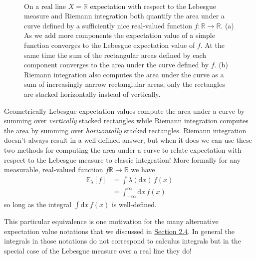 \documentclass[
  letterpaper,
  DIV=11,
  numbers=noendperiod]{scrartcl}
\begin{document}
\begin{figure}
\begin{minipage}[t]{0.90\linewidth}
{}

\subcaption{\label{fig-riemann}}
\end{minipage}%
%
\begin{minipage}[t]{0.05\linewidth}

{\centering 

~

}

\end{minipage}%

\caption{\label{fig-integrate}On a real line \(X = \mathbb{R}\)
expectation with respect to the Lebesgue measure and Riemann integration
both quantify the area under a curve defined by a sufficiently nice
real-valued function \(f : \mathbb{R} \rightarrow \mathbb{R}\). (a) As
we add more components the expectation value of a simple function
converges to the Lebesgue expectation value of \(f\). At the same time
the sum of the rectangular areas defined by each component converges to
the area under the curve defined by \(f\). (b) Riemann integration also
computes the area under the curve as a sum of increasingly narrow
rectanglular areas, only the rectangles are stacked horizontally instead
of vertically.}

\end{figure}

Geometrically Lebesgue expectation values compute the area under a curve
by summing over \emph{vertically} stacked rectangles while Riemann
integration computes the area by summing over \emph{horizontally}
stacked rectangles. Riemann integration doesn't always result in a
well-defined answer, but when it does we can use these two methods for
computing the area under a curve to relate expectation with respect to
the Lebesgue measure to classic integration! More formally for any
measurable, real-valued function \(f \mathbb{R} \rightarrow \mathbb{R}\)
we have \begin{align*}
\mathbb{E}_{\lambda}[f]
&= \int \lambda( \mathrm{d} x) \, f(x)
\\
&= \int_{-\infty}^{\infty} \mathrm{d} x \, f(x)
\end{align*} so long as the integral \(\int \mathrm{d} x \, f(x)\) is
well-defined.

This particular equivalence is one motivation for the many alternative
expectation value notations that we discussed in
\href{@sec:alt_notations}{Section 2.4}. In general the integrals in
those notations do not correspond to calculus integrals but in the
special case of the Lebesgue measure over a real line they do!
\end{document}
